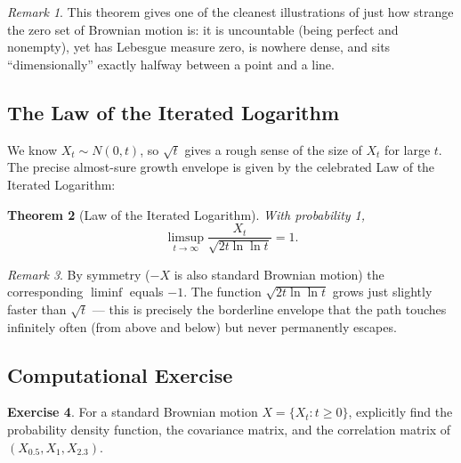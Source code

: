 \documentclass[12pt,openany]{book}
\newtheorem{theorem}{Theorem}[section]
\theoremstyle{definition}
\newtheorem{exercise}[theorem]{Exercise}
\theoremstyle{remark}
\newtheorem{remark}[theorem]{Remark}
\begin{document}
\begin{remark}
This theorem gives one of the cleanest illustrations of just how strange the zero set of Brownian motion is: it is uncountable (being perfect and nonempty), yet has Lebesgue measure zero, is nowhere dense, and sits ``dimensionally'' exactly halfway between a point and a line.
\end{remark}
 
\subsection{The Law of the Iterated Logarithm}
\label{sec:lil}
 
We know $X_t \sim N(0,t)$, so $\sqrt t$ gives a rough sense of the size of $X_t$ for large $t$. The precise almost-sure growth envelope is given by the celebrated Law of the Iterated Logarithm:
 
\begin{theorem}[Law of the Iterated Logarithm]
With probability 1,
\begin{equation}
    \limsup_{t\to\infty} \frac{X_t}{\sqrt{2t\ln\ln t}} = 1. \tag{18.1.37}
\end{equation}
\end{theorem}
 
\begin{remark}
By symmetry ($-X$ is also standard Brownian motion) the corresponding $\liminf$ equals $-1$. The function $\sqrt{2t\ln\ln t}$ grows just slightly faster than $\sqrt t$ — this is precisely the borderline envelope that the path touches infinitely often (from above and below) but never permanently escapes.
\end{remark}
 
\subsection{Computational Exercise}
 
\begin{exercise}
For a standard Brownian motion $X = \{X_t : t\ge 0\}$, explicitly find the probability density function, the covariance matrix, and the correlation matrix of $(X_{0.5}, X_1, X_{2.3})$.
\end{exercise}
 
\end{document}
